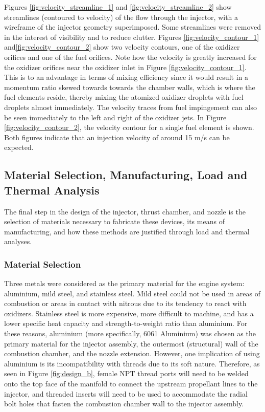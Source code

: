 \documentclass[9pt]{article} %
\numberwithin{equation}{section} %
\begin{document}
Figures \ref{fig:velocity_streamline_1} and \ref{fig:velocity_streamline_2} show streamlines (contoured to velocity) of the flow through the injector, with a wireframe of the injector geometry superimposed. Some streamlines were removed in the interest of visibility and to reduce clutter. Figures \ref{fig:velocity_contour_1} and\ref{fig:velocity_contour_2} show two velocity contours, one of the oxidizer orifices and one of the fuel orifices. Note how the velocity is greatly increased for the oxidizer orifices near the oxidizer inlet in Figure \ref{fig:velocity_contour_1}. This is to an advantage in terms of mixing efficiency since it would result in a momentum ratio skewed towards towards the chamber walls, which is where the fuel elements reside, thereby mixing the atomized oxidizer droplets with fuel droplets almost immediately. The velocity traces from fuel impingement can also be seen immediately to the left and right of the oxidizer jets. In Figure \ref{fig:velocity_contour_2}, the velocity contour for a single fuel element is shown. Both figures indicate that an injection velocity of around 15 m/s can be expected.

\subsection{Material Selection, Manufacturing, Load and Thermal Analysis}

\hspace{\parindent} The final step in the design of the injector, thrust chamber, and nozzle is the selection of materials necessary to fabricate these devices, its means of manufacturing, and how these methods are justified through load and thermal analyses.

\subsubsection{Material Selection}

\hspace{\parindent} Three metals were considered as the primary material for the engine system: aluminium, mild steel, and stainless steel. Mild steel could not be used in areas of combustion or areas in contact with nitrous due to its tendency to react with oxidizers. Stainless steel is more expensive, more difficult to machine, and has a lower specific heat capacity and strength-to-weight ratio than aluminium. For these reasons, aluminium (more specifically, 6061 Aluminium) was chosen as the primary material for the injector assembly, the outermost (structural) wall of the combustion chamber, and the nozzle extension. However, one implication of using aluminium is its incompatibility with threads due to its soft nature. Therefore, as seen in Figure \ref{fig:design_b}, female NPT thread ports will need to be welded onto the top face of the manifold to connect the upstream propellant lines to the injector, and threaded inserts will need to be used to accommodate the radial bolt holes that fasten the combustion chamber wall to the injector assembly.
\end{document}
